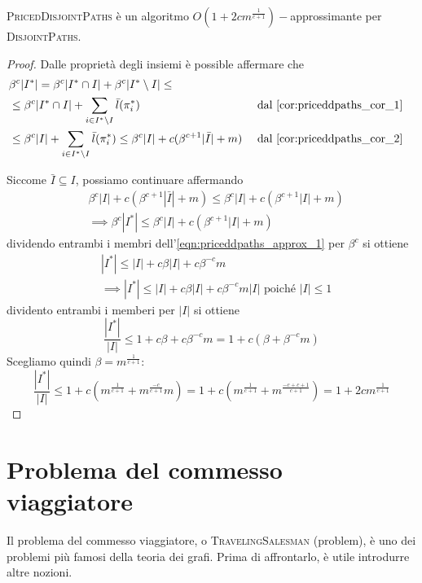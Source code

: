 \begin{theorem}\label{thm:priceddpaths_approx}
	\textsc{PricedDisjointPaths} è un algoritmo $O(1 + 2cm^{\frac{1}{c+1}})-$approssimante per
	\textsc{DisjointPaths}.
\end{theorem}
\begin{proof}
	Dalle proprietà degli insiemi è possible affermare che
	\begin{align*}
		 & \beta^c |I^*| = \beta^c |I^* \cap I| + \beta^c |I^* \setminus I| \leq                                                                                         \\
		 & \leq \beta^c|I^*\cap I| + \sum_{i \in I^* \setminus I} \bar{l}(\pi_i^*)                                        &  &
		\text{ dal \cref{cor:priceddpaths_cor_1}}                                                                                                                        \\
		 & \leq \beta^c |I| + \sum_{i \in I^* \setminus I} \bar{l}(\pi_i^*) \leq \beta^c |I| + c (\beta^{c+1}|\bar{I}|+m) &  & \text{ dal \cref{cor:priceddpaths_cor_2}}
	\end{align*}

	Siccome $\bar{I} \subseteq I$, possiamo continuare affermando
	\begin{align}
		 & \beta^c |I| + c (\beta^{c+1}|\bar{I}|+m) \leq \beta^c |I| + c (\beta^{c+1}|I|+m) \nonumber       \\
		 & \implies \beta^c |I^*| \leq \beta^c |I| + c (\beta^{c+1}|I|+m) \label{eqn:priceddpaths_approx_1}
	\end{align}
	dividendo entrambi i membri dell'\cref{eqn:priceddpaths_approx_1} per $\beta^c$ si ottiene
	\begin{align*}
		 & |I^*| \leq |I| + c\beta|I| + c \beta^{-c}m                                              \\
		 & \implies |I^*| \leq |I| + c\beta|I| + c \beta^{-c}m|I| \text{    poiché    } |I| \leq 1
	\end{align*}
	dividento entrambi i memberi per $|I|$ si ottiene
	$$
		\frac{|I^*|}{|I|} \leq 1 + c\beta + c\beta^{-c}m = 1 + c(\beta + \beta^{-c}m)
	$$
	Scegliamo quindi $\beta=m^{\frac{1}{c+1}}$:
	$$
		\frac{|I^*|}{|I|} \leq 1 + c (m^{\frac{1}{c+1}} + m^{\frac{-c}{c+1}}m)
		= 1 + c (m^{\frac{1}{c+1}} + m^{\frac{-c + c + 1}{c+1}})
		= 1 + 2 c m^{\frac{1}{c+1}}
	$$
\end{proof}

\section{Problema del commesso viaggiatore}
Il problema del commesso viaggiatore, o \textsc{TravelingSalesman} (problem), è uno
dei problemi più famosi della teoria dei grafi. Prima di affrontarlo, è utile
introdurre altre nozioni.

